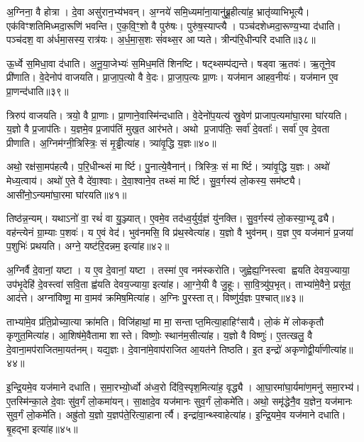 अ॒ग्निना॒ वै होत्रा।
दे॒वा असु॑रान॒भ्य॑भवन्।
अ॒ग्नये॑ समि॒ध्यमा॑ना॒यानु॑ब्रू॒हीत्या॑ह॒ भ्रातृ॑व्याभिभूत्यै।
एक॑विꣳशतिमिध्मदा॒रूणि॑ भवन्ति।
ए॒क॒वि॒ꣳ॒शो वै पुरु॑षः।
पुरु॑ष॒स्याप्त्यै।
पञ्च॑दशेध्मदा॒रूण्य॒भ्या द॑धाति।
पञ्च॑दश॒ वा अ॑र्धमा॒सस्य॒ रात्र॑यः।
अ॒र्ध॒मा॒स॒शः सं॑वथ्स॒र आप्यते।
त्रीन्प॑रि॒धीन्परि॑ दधाति॥३८॥

ऊ॒र्ध्वे स॒मिधा॒वा द॑धाति।
अ॒नू॒या॒जेभ्यः॑ स॒मिध॒मति॑ शिनष्टि।
षट्थ्सम्प॑द्यन्ते।
षड्वा ऋ॒तवः॑।
ऋ॒तूने॒व प्री॑णाति।
वे॒देनोप॑ वाजयति।
प्रा॒जा॒प॒त्यो वै वे॒दः।
प्रा॒जा॒प॒त्यः प्रा॒णः।
यज॑मान आहव॒नीयः॑।
यज॑मान ए॒व प्रा॒णन्द॑धाति॥३९॥

त्रिरुप॑ वाजयति।
त्रयो॒ वै प्रा॒णाः।
प्रा॒णाने॒वास्मि॑न्दधाति।
वे॒देनो॑प॒यत्य॑ स्रु॒वेण॑ प्राजाप॒त्यमा॑घा॒रमा घा॑रयति।
य॒ज्ञो वै प्र॒जाप॑तिः।
य॒ज्ञमे॒व प्र॒जाप॑तिं मुख॒त आर॑भते।
अथो प्र॒जाप॑तिः॒ सर्वा॑ दे॒वताः᳚।
सर्वा॑ ए॒व दे॒वता प्रीणाति।
अ॒ग्निम॑ग्नी॒त्रिस्त्रिः॒ सं मृ॒ड्ढीत्या॑ह।
त्र्या॑वृ॒द्धि य॒ज्ञः॥४०॥

अथो॒ रक्ष॑सा॒मप॑हत्यै।
प॒रि॒धीन्थ्सं मार्ष्टि।
पु॒नात्ये॒वैनान्॑।
त्रिस्त्रिः॒ सं मार्ष्टि।
त्र्या॑वृ॒द्धि य॒ज्ञः।
अथो॑ मेध्य॒त्वाय॑।
अथो॑ ए॒ते वै दे॑वा॒श्वाः।
दे॒वा॒श्वाने॒व तथ्सं मार्ष्टि।
सु॒व॒र्गस्य॑ लो॒कस्य॒ सम॑ष्ट्यै।
आसी॑नो॒\-ऽन्यमा॑घा॒रमा घा॑रयति॥४१॥

तिष्ठ॑न्न॒न्यम्।
यथाऽनो॑ वा॒ रथं॑ वा यु॒ञ्ज्यात्।
ए॒वमे॒व तद॑ध्व॒र्युर्य॒ज्ञं यु॑नक्ति।
सु॒व॒र्गस्य॑ लो॒कस्या॒भ्यूढ्यै।
वह॑न्त्येनं ग्रा॒म्याः प॒शवः॑।
य ए॒वं वेद॑।
भुव॑नमसि॒ वि प्र॑थ॒स्वेत्या॑ह।
य॒ज्ञो वै भुव॑नम्।
य॒ज्ञ ए॒व यज॑मानं प्र॒जया॑ प॒शुभिः॑ प्रथयति।
अग्ने॒ यष्ट॑रि॒दन्नम॒ इत्या॑ह॥४२॥

अ॒ग्निर्वै दे॒वानां॒ यष्टा।
य ए॒व दे॒वानां॒ यष्टा।
तस्मा॑ ए॒व नम॑स्करोति।
जुह्वेह्य॒ग्निस्त्वा ह्वयति देवय॒ज्याया॒ उप॑भृ॒देहि॑ दे॒वस्त्वा॑ सवि॒ता ह्व॑यति देवय॒ज्याया॒ इत्या॑ह।
आ॒ग्ने॒यी वै जु॒हूः।
सा॒वि॒त्र्यु॑प॒भृत्।
ताभ्या॑मे॒वैने॒ प्रसू॑त॒ आद॑त्ते।
अग्ना॑विष्णू॒ मा वा॒मव॑ क्रमिष॒मित्या॑ह।
अ॒ग्निः पु॒रस्तात्।
विष्णु॑र्य॒ज्ञः प॒श्चात्॥४३॥

ताभ्या॑मे॒व प्र॑ति॒प्रोच्या॒त्या क्रा॑मति।
विजि॑हाथां॒ मा मा॒ सन्ताप्त॒मित्या॒हाहिꣳ॑सायै।
लो॒कं मे॑ लोककृतौ कृणुत॒मित्या॑ह।
आ॒शिष॑मे॒वैतामा शास्ते।
विष्णोः॒ स्थान॑म॒सीत्या॑ह।
य॒ज्ञो वै विष्णुः॑।
ए॒तत्खलु॒ वै दे॒वाना॒मप॑राजितमा॒यत॑नम्।
यद्य॒ज्ञः।
दे॒वाना॑मे॒वाप॑राजित आ॒यत॑ने तिष्ठति।
इ॒त इन्द्रो॑ अकृणोद्वी॒र्या॑णीत्या॑ह॥४४॥

इ॒न्द्रि॒यमे॒व यज॑माने दधाति।
स॒मा॒रभ्यो॒र्ध्वो अ॑ध्व॒रो दि॑वि॒स्पृश॒मित्या॑ह॒ वृद्ध्यै।
आ॒घा॒रमा॑घा॒र्यमा॑ण॒मनु॑ समा॒रभ्य॑।
ए॒तस्मि॑न्का॒ले दे॒वाः सु॑व॒र्गं लो॒कमा॑यन्।
सा॒क्षादे॒व यज॑मानः सुव॒र्गं लो॒कमे॑ति।
अथो॒ समृ॑द्धेनै॒व य॒ज्ञेन॒ यज॑मानः सुव॒र्गं लो॒कमे॑ति।
अह्रु॑तो य॒ज्ञो य॒ज्ञप॑ते॒रित्या॒हानार्त्यै।
इन्द्रा॑वा॒न्थ्स्वाहेत्या॑ह।
इ॒न्द्रि॒यमे॒व यज॑माने दधाति।
बृ॒हद्भा इत्या॑ह॥४५॥

